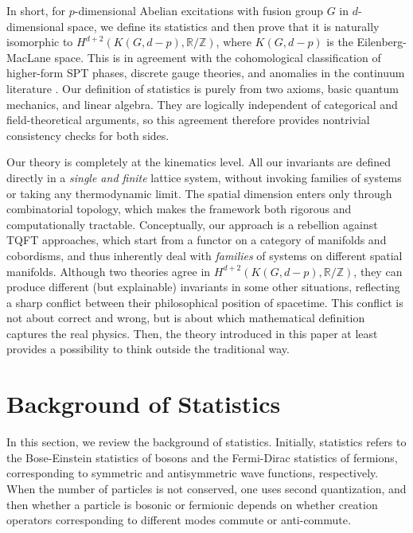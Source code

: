 \documentclass[reprint, amsmath, amssymb, showpacs, floatfix, longbibliography, aps, twocolumn, superscriptaddress, nofootinbib]{revtex4-2}
\newcommand{\ZZ}{{\mathbb Z}}
\newcommand{\RR}{{\mathbb R}}
\theoremstyle{definition}
\begin{document}
 In short, for $p$-dimensional Abelian excitations with fusion group $G$ in $d$-dimensional space, we define its statistics and then prove that it is naturally isomorphic to $H^{d+2}(K(G,d-p),\RR/\ZZ)$, where $K(G,d-p)$ is the Eilenberg-MacLane space. This is in agreement with the cohomological classification of higher-form SPT phases, discrete gauge theories, and anomalies in the continuum literature \cite{Chen2013Symmetry,Kapustin:2013uxa,feng2025higherformanomalieslattices}. Our definition of statistics is purely from two axioms, basic quantum mechanics, and linear algebra. They are logically independent of categorical and field-theoretical arguments, so this agreement therefore provides nontrivial consistency checks for both sides.

Our theory is completely at the kinematics level. All our invariants are defined directly in a \textit{single and finite} lattice system, without invoking families of systems or taking any thermodynamic limit. The spatial dimension enters only through combinatorial topology, which makes the framework both rigorous and computationally tractable. Conceptually, our approach is a rebellion against TQFT approaches, which start from a functor on a category of manifolds and cobordisms, and thus inherently deal with \textit{families }of systems on different spatial manifolds. Although two theories agree in $H^{d+2}(K(G,d-p),\RR/\ZZ)$, they can produce different (but explainable) invariants in some other situations, reflecting a sharp conflict between their philosophical position of spacetime. This conflict is not about correct and wrong, but is about which mathematical definition captures the real physics. Then, the theory introduced in this paper at least provides a possibility to think outside the traditional way.


\section{Background of Statistics}\label{secBackground}

In this section, we review the background of statistics. Initially, statistics refers to the Bose-Einstein statistics of bosons and the Fermi-Dirac statistics of fermions,  corresponding to symmetric and antisymmetric wave functions, respectively. When the number of particles is not conserved, one uses second quantization, and then whether a particle is bosonic or fermionic depends on whether creation operators corresponding to different modes commute or anti-commute.
\end{document}
